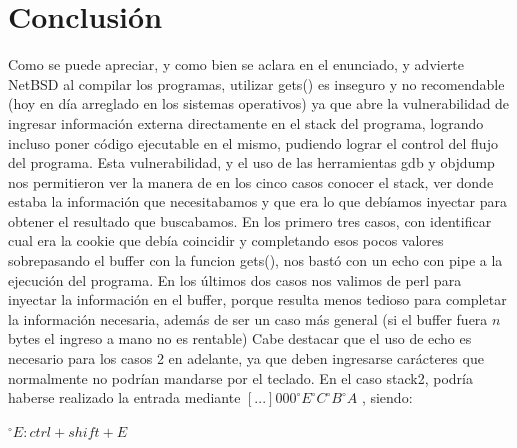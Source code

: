 \documentclass[a4paper,10pt]{article}
\begin{document}
\lstset{ language = C, numbers=left, tabsize=4, breaklines=true, frame=single }


\lstset{ language = C, numbers=left, tabsize=4, breaklines=true, frame=single }


\lstset{ language = C, numbers=left, tabsize=4, breaklines=true, frame=single }


\lstset{ language = C, numbers=left, tabsize=4, breaklines=true, frame=single }


\newpage
\section{Conclusión}

   Como se puede apreciar, y como bien se aclara en el enunciado, y advierte NetBSD al compilar los programas, utilizar gets() es inseguro y no recomendable (hoy en día arreglado en los sistemas operativos) ya que abre la vulnerabilidad de ingresar información externa directamente en el stack del programa, logrando incluso poner código ejecutable en el mismo, pudiendo lograr el control del flujo del programa. 
   \newline
  Esta vulnerabilidad, y el uso de las herramientas gdb y objdump nos permitieron ver la manera de en los cinco casos conocer el stack, ver donde estaba la información que necesitabamos y que era lo que debíamos inyectar para obtener el resultado que buscabamos.  
    En los primero tres casos, con identificar cual era la cookie que debía coincidir y completando esos pocos valores sobrepasando el buffer con la funcion gets(), nos bastó con un echo con pipe a la ejecución del programa.
    \newline
   En los últimos dos casos nos valimos de perl para inyectar la información en el buffer, porque resulta menos tedioso para completar la información necesaria, además de ser un caso más general (si el buffer fuera $n$ bytes el ingreso a mano no es rentable) \newline
   Cabe destacar que el uso de echo es necesario para los casos 2 en adelante, ya que deben ingresarse carácteres que normalmente no podrían mandarse por el teclado.\newline
   En el caso stack2, podría haberse realizado la entrada mediante $[...]000^{\circ}E^{\circ}C^{\circ}B^{\circ}A$
   , siendo:
   
   $^{\circ}E: ctrl+shift+E$
    
\end{document}
